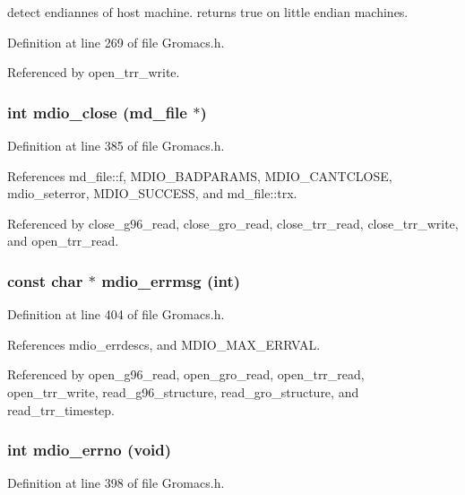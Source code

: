 detect endiannes of host machine. returns true on little endian machines. 

Definition at line 269 of file Gromacs.h.

Referenced by open\_\-trr\_\-write.
\subsubsection{\setlength{\rightskip}{0pt plus 5cm}int mdio\_\-close ({\bf md\_\-file} $\ast$)\hspace{0.3cm}{\tt  [static]}}\label{Gromacs_8h_a37}




Definition at line 385 of file Gromacs.h.

References md\_\-file::f, MDIO\_\-BADPARAMS, MDIO\_\-CANTCLOSE, mdio\_\-seterror, MDIO\_\-SUCCESS, and md\_\-file::trx.

Referenced by close\_\-g96\_\-read, close\_\-gro\_\-read, close\_\-trr\_\-read, close\_\-trr\_\-write, and open\_\-trr\_\-read.
\subsubsection{\setlength{\rightskip}{0pt plus 5cm}const char $\ast$ mdio\_\-errmsg (int)\hspace{0.3cm}{\tt  [static]}}\label{Gromacs_8h_a58}




Definition at line 404 of file Gromacs.h.

References mdio\_\-errdescs, and MDIO\_\-MAX\_\-ERRVAL.

Referenced by open\_\-g96\_\-read, open\_\-gro\_\-read, open\_\-trr\_\-read, open\_\-trr\_\-write, read\_\-g96\_\-structure, read\_\-gro\_\-structure, and read\_\-trr\_\-timestep.
\subsubsection{\setlength{\rightskip}{0pt plus 5cm}int mdio\_\-errno (void)\hspace{0.3cm}{\tt  [static]}}\label{Gromacs_8h_a57}




Definition at line 398 of file Gromacs.h.

